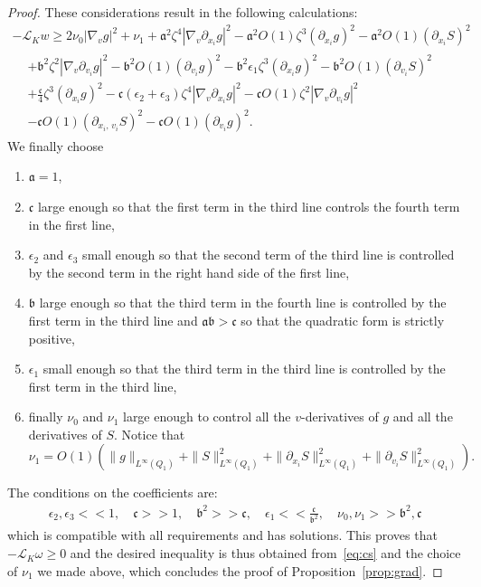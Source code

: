 \documentclass[AHL,Unicode,longabstracts,published]{cedram}
\newcommand{\cL}{\mathcal{L}}
\newcommand{\frka}{\mathfrak{a}}
\newcommand{\frkb}{\mathfrak{b}}
\newcommand{\frkc}{\mathfrak{c}}
\begin{document}
\begin{proof}
These considerations result in the following calculations:
\begin{multline*}
- \cL_K w \ge 2 \nu_0 \left|\nabla_v g\right|^2 + \nu_1 + \frka^2 \zeta^4 \left|\nabla_v
\partial_{x_i}g\right|^2 - \frka^2 O(1) \zeta^3 \left(\partial_{x_i}g\right)^2 - \frka^2 O(1) (\partial_{x_i}S)^2 \\
\begin{aligned}
& + \frkb^2 \zeta^2 \left|\nabla_v \partial_{v_i} g\right|^2 - \frkb^2 O(1) \left(\partial_{v_i} g\right)^2 - \frkb^2 \epsilon_1 \zeta^3 \left(\partial_{x_i}g\right)^2 - \frkb^2 O(1) \left(\partial_{v_i} S\right)^2 \\
& + \frac{\frkc}4 \zeta^3 \left(\partial_{x_i} g\right)^2 - \frkc \left(\epsilon_2 +\epsilon_3\right) \zeta^4 \left|\nabla_v\partial_{x_i}g\right|^2 - \frkc O(1) \zeta^2 \left|\nabla_v \partial_{v_i} g \right|^2 \\
& - \frkc O(1) \left(\partial_{x_i,\,v_i}S\right)^2 - \frkc O(1) \left(\partial_{v_i}g\right)^2.
\end{aligned}
\end{multline*}
We finally choose
\begin{enumerate}
\item \label{proofprop3.1.2.1}$\frka=1$,
\item \label{proofprop3.1.2.2}$\frkc$ large enough so that the first term in the third line controls the fourth term in the first line,
\item \label{proofprop3.1.2.3}$\epsilon_2$ and $\epsilon_3$ small enough so that the second term of the third line is controlled by the second term in the right hand side of the first line,
\item \label{proofprop3.1.2.4}$\frkb$ large enough so that the third term in the fourth line is controlled by the first term in the third line and $\frka \frkb > \frkc$ so that the quadratic form is strictly positive,
\item \label{proofprop3.1.2.5}$\epsilon_1$ small enough so that the third term in the third line is controlled by the first term in the third line,
\item \label{proofprop3.1.2.6}finally $\nu_0$ and $\nu_1$ large enough to control all the $v$-derivatives of $g$ and all the derivatives of $S$. Notice that
\[
\nu_1 = O(1)\left(\| g \|_{L^\infty(Q_1)} + \|S\|_{L^\infty(Q_1)}^2 + \|\partial_{x_i} S\|_{L^\infty(Q_1)}^2+ \|\partial_{v_i} S\|_{L^\infty(Q_1)}^2\right).
\]
\end{enumerate}
The conditions on the coefficients are:
\begin{align*}
\epsilon_2, \epsilon_3 <<1, \quad \frkc >> 1, \quad
\frkb^2 >> \frkc, \quad
\epsilon_1 << \frac{\frkc}{\frkb^2}, \quad
\nu_0, \nu_1 >> \frkb^2, \frkc
\end{align*}
which is compatible with all requirements and has solutions. This proves that $-\cL_K \omega \ge 0$ and the desired inequality is thus obtained from~\eqref{eq:cs} and the choice of $\nu_1$ we made above, which concludes the proof of Proposition~\ref{prop:grad}.
\end{proof}
\end{document}
